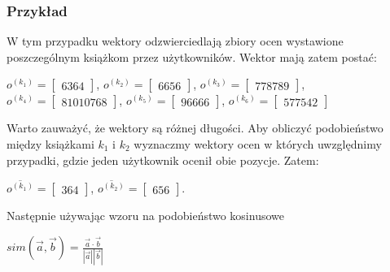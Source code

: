 \documentclass[12pt,a4paper]{report}
\begin{document}
\subsubsection{Przykład}
W tym przypadku wektory odzwierciedlają zbiory ocen wystawione poszczególnym książkom przez użytkowników.
Wektor mają zatem postać:
\begin{center}
$o^{(k_1)} = \left[
        \begin{array}{c}
         6 
         3 
         6 
         4 
         \end{array}
      \right]$, $o^{(k_2)} = \left[
        \begin{array}{c}
         6 
         6 
         5 
         6
         \end{array}
      \right]$, $o^{(k_3)} = \left[
        \begin{array}{c}
         7 
         7 
         8 
         7 
         8 
         9
         \end{array}
      \right]$, $o^{(k_4)} = \left[
        \begin{array}{c}
         8 
         10 
         10 
         7 
         6 
         8
         \end{array}
      \right]$, $o^{(k_5)} = \left[
        \begin{array}{c}
         9 
         6 
         6 
         6 
         6
         \end{array}
      \right]$, $o^{(k_6)} = \left[
        \begin{array}{c}
         5 
         7 
         7 
         5 
         4 
         2
         \end{array}
      \right]$
\end{center}
Warto zauważyć, że wektory są różnej długości.
Aby obliczyć podobieństwo między książkami $k_1$ i $k_2$ wyznaczmy wektory ocen w których uwzględnimy przypadki, gdzie jeden użytkownik ocenił obie pozycje.
Zatem:
\begin{center}
$\overline{o^{(k_1)}} = \left[
        \begin{array}{c}
         3 
         6 
         4
         \end{array}
      \right]$, $\overline{o^{(k_2)}} = \left[
        \begin{array}{c}
         6 
         5 
         6
         \end{array}
      \right]$.
\end{center}
Następnie używając wzoru na podobieństwo kosinusowe
\begin{center}
$sim(\overrightarrow{a},\overrightarrow{b}) = \frac{\overrightarrow{a} \cdot \overrightarrow{b}}{|\overrightarrow{a}||\overrightarrow{b}|}$ 
\end{center}
\end{document}
